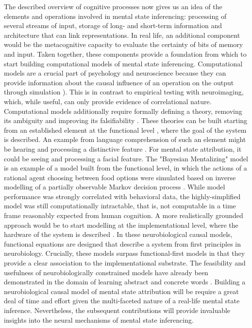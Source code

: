The described overview of cognitive processes now gives us an idea of the elements and operations involved in mental state inferencing: processing of several streams of input, storage of long- and short-term information and architecture that can link representations. In real life, an additional component would be the metacognitive capacity to evaluate the certainty of bits of memory and input. Taken together, these components provide a foundation from which to start building computational models of mental state inferencing. Computational models are a crucial part of psychology and neuroscience because they can provide information about the causal influence of an operation on the output through simulation \citep{guest2020}). This is in contrast to empirical testing with neuroimaging, which, while useful, can only provide evidence of correlational nature. Computational models additionally require formally defining a theory, removing its ambiguity and improving its falsifiability \citep{guest2021}. These theories can be built starting from an established element at the functional level \citep[or computational level][]{marr1982}, where the goal of the system is described. An example from language comprehension of such an element might be hearing and processing a distinctive feature \citep[the most basic unit in phonology][]{poeppel2005}. For mental state attribution, it could be seeing and processing a facial feature. The "Bayesian Mentalizing" model is an example of a model built from the functional level, in which the actions of a rational agent choosing between food options were simulated based on inverse modelling of a partially observable Markov decision process \citep{baker2017}. While model performance was strongly correlated with behavioral data, the highly-simplified model was still computationally intractable, that is, not computable in a time frame reasonably expected from human cognition. A more realistically grounded approach would be to start modelling at the implementational level, where the hardware of the system is described \citep{fitz2024}. In these neurobiological causal models, functional equations are designed that describe a system from first principles in neurobiology. Crucially, these models surpass functional-first models in that they provide a clear association to the implementational substrate. The feasibility and usefulness of neurobiologically constrained models have already been demonstrated in the domain of learning abstract and concrete words \citep{dobler2024}. Building a neurobiological causal model of mental state attribution will be require a great deal of time and effort given the multi-faceted nature of a real-life mental state inference. Nevertheless, the subsequent contributions will provide invaluable insights into the neural mechanisms of mental state inferencing.  

